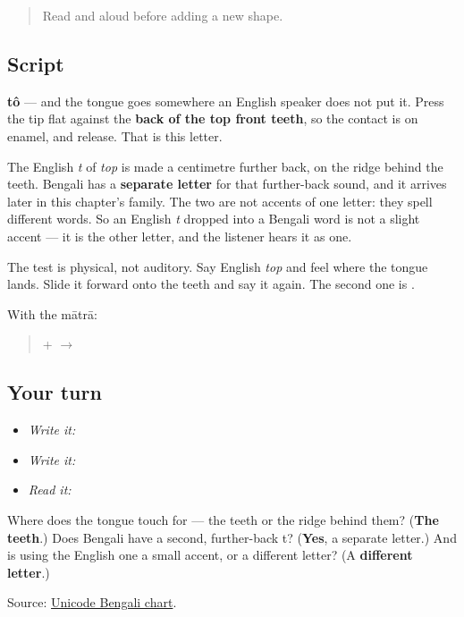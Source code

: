 \label{lesson:BN-W02-ta}



\begin{quote}
Read \textbf{} and \textbf{} aloud before adding a new shape.
\end{quote}

\subsection*{Script}
\begin{quote}
\end{quote}

\textbf{tô} — and the tongue goes somewhere an English speaker does not put it. Press the tip flat against the \textbf{back of the top front teeth}, so the contact is on enamel, and release. That is this letter.

The English \emph{t} of \emph{top} is made a centimetre further back, on the ridge behind the teeth. Bengali has a \textbf{separate letter} for that further-back sound, and it arrives later in this chapter's family. The two are not accents of one letter: they spell different words. So an English \emph{t} dropped into a Bengali word is not a slight accent — it is the other letter, and the listener hears it as one.

The test is physical, not auditory. Say English \emph{top} and feel where the tongue lands. Slide it forward onto the teeth and say it again. The second one is \textbf{}.

With the mātrā:

\begin{quote}
\textbf{} + \textbf{} $\to$ \textbf{}
\end{quote}

\subsection*{Your turn}
\begin{itemize}
\raggedright
  \item \emph{Write it:} 
  \item \emph{Write it:} 
  \item \emph{Read it:} 
\end{itemize}

\begin{tcolorbox}[breakable,colback=teal!4,colframe=teal!35!black,title={Before you move on}]
Where does the tongue touch for \textbf{} — the teeth or the ridge behind them? (\textbf{The teeth}.) Does Bengali have a second, further-back t? (\textbf{Yes}, a separate letter.) And is using the English one a small accent, or a different letter? (A \textbf{different letter}.)

Source: \href{https://www.unicode.org/charts/PDF/U0980.pdf}{Unicode Bengali chart}.
\end{tcolorbox}
